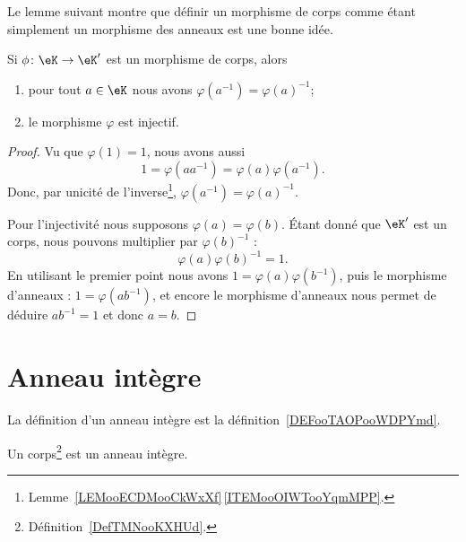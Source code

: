 Le lemme suivant montre que définir un morphisme de corps comme étant simplement un morphisme des anneaux est une bonne idée.
\begin{lemma}       \label{LEMooWBOPooZnsZgQ}
    Si \( \phi\colon \eK\to \eK'\) est un morphisme de corps, alors
    \begin{enumerate}
        \item
            pour tout \( a\in \eK\) nous avons \( \varphi(a^{-1})=\varphi(a)^{-1}\);
        \item
            le morphisme \( \varphi\) est injectif.
    \end{enumerate}
\end{lemma}

\begin{proof}
    Vu que \( \varphi(1)=1\), nous avons aussi
    \begin{equation}
        1=\varphi(aa^{-1})=\varphi(a)\varphi(a^{-1}).
    \end{equation}
    Donc, par unicité de l'inverse\footnote{Lemme~\ref{LEMooECDMooCkWxXf}\,\ref{ITEMooOIWTooYqmMPP}.}, \( \varphi(a^{-1})=\varphi(a)^{-1}\).

    Pour l'injectivité nous supposons \( \varphi(a)=\varphi(b)\). Étant donné que \( \eK'\) est un corps, nous pouvons multiplier par \( \varphi(b)^{-1}\) :
    \begin{equation}
        \varphi(a)\varphi(b)^{-1}=1.
    \end{equation}
    En utilisant le premier point nous avons \( 1=\varphi(a)\varphi(b^{-1})\), puis le morphisme d'anneaux : \( 1=\varphi(ab^{-1})\), et encore le morphisme d'anneaux nous permet de déduire \( ab^{-1}=1\) et donc \(a=b\).
\end{proof}

\section{Anneau intègre}
\label{SECAnneauxIntegres}

La définition d'un anneau intègre est la définition~\ref{DEFooTAOPooWDPYmd}.

\begin{lemma}     \label{LEMooZSMEooUmSXWZ}
    Un corps\footnote{Définition~\ref{DefTMNooKXHUd}.} est un anneau intègre.
\end{lemma}

